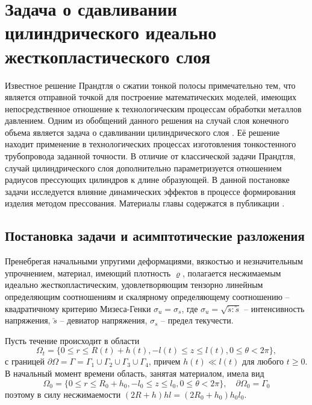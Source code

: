\chapter{Задача о сдавливании цилиндрического идеально жесткопластического слоя}\label{ch:ch2}
Известное решение Прандтля \autocite{Prandtl:1948} о сжатии тонкой полосы примечательно тем, что является отправной точкой для построение математических моделей, имеющих непосредственное отношение к технологическим процессам обработки металлов давлением. Одним из обобщений данного решения на случай слоя конечного объема является задача о сдавливании цилиндрического слоя \autocite{Georgievsky:2010}. Её решение находит применение в технологических процессах изготовления тонкостенного трубопровода заданной точности. В отличие от классической задачи Прандтля, случай цилиндрического слоя дополнительно параметризуется отношением радиусов прессующих цилиндров к длине образующей. В данной постановке задачи исследуется влияние динамических эффектов в процессе формирования изделия методом прессования. Материалы главы содержатся в публикации \autocite{Shabaykin:2020b}.

\section{Постановка задачи и асимптотические разложения}\label{sec:ch2/sec1}

Пренебрегая начальными упругими деформациями, вязкостью и незначительным упрочнением, материал, имеющий плотность $\varrho$, полагается несжимаемым идеально жесткопластическим, удовлетворяющим тензорно линейным определяющим соотношениям и скалярному определяющему соотношению -- квадратичному критерию Мизеса-Генки $\sigma_{u} = \sigma_{s}$, где $\sigma_{u} = \sqrt{\utilde{s} : \utilde{s}}$ -- интенсивность напряжения, $\utilde{s}$ -- девиатор напряжения, $\sigma_{s}$ -- предел текучести.

Пусть течение происходит в области
\begin{equation}
  \Omega_{t} = \{0 \le r \le R(t) + h(t), -l(t) \le z \le l(t), 0 \le \theta < 2\pi\},
\end{equation}
с границей $\partial\Omega = \Gamma = \Gamma_{1} \cup \Gamma_{2} \cup \Gamma_{3}\cup \Gamma_{4}$, причем $h(t) \ll l(t)$ для любого $t \ge 0$. В начальный момент времени область, занятая материалом, имела вид
\begin{equation}
  \Omega_{0} = \{0 \le r \le R_{0} + h_{0}, -l_{0} \le z \le l_{0}, 0 \le \theta < 2\pi\}, \quad \partial\Omega_{0} = \Gamma_{0}
\end{equation}
поэтому в силу несжимаемости $(2R+h)hl=(2R_{0}+h_{0})h_{0}l_{0}$.

